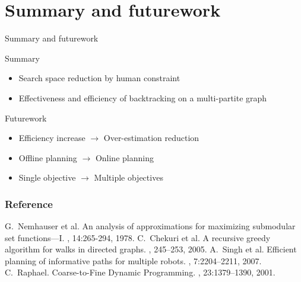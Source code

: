 \section{Summary and futurework}

\begin{frame}{Summary and futurework}

\begin{block}{Summary}
\begin{itemize}
\item Search space reduction by \alert{human constraint}
\item Effectiveness and efficiency of \alert{backtracking} on a multi-partite graph
\end{itemize}
\end{block}

\bigskip

\begin{block}{Futurework}
\begin{itemize}
\item Efficiency increase  $ \rightarrow $ Over-estimation reduction
\item Offline planning $ \rightarrow $ Online planning
\item Single objective $ \rightarrow $ Multiple objectives
\end{itemize}
\end{block}

\end{frame}

\begin{frame}[allowframebreaks]
  \frametitle<presentation>{Reference}    
  \begin{thebibliography}{10} 
	\beamertemplatearticlebibitems
	 G.~Nemhauser et al.
	 \newblock An analysis of approximations for maximizing submodular set functions—I.
	 ,  14:265-294, 1978.
	\beamertemplatearticlebibitems
	  C.~Chekuri et al.
	  \newblock A recursive greedy algorithm for walks in directed graphs.
	  , 245--253, 2005.   
	\beamertemplatearticlebibitems
	  A.~Singh et al.
	  \newblock Efficient planning of informative paths for multiple robots.
	  , 7:2204--2211, 2007.
	\beamertemplatearticlebibitems
	C.~Raphael.
	\newblock Coarse-to-Fine Dynamic Programming.
	, 23:1379--1390, 2001.
  \end{thebibliography}
\end{frame}